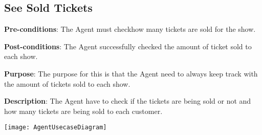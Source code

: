\subsection{See Sold Tickets}
\textbf{Pre-conditions}: The Agent must checkhow many tickets are
sold for the show.

\textbf{Post-conditions}: The Agent successfully checked the amount
of ticket sold to each show.

\textbf{Purpose}: The purpose for this is that the Agent need to
always keep track with the amount of tickets sold to each show.

\textbf{Description}: The Agent have to check if the tickets are
being sold or not and how many tickets are being sold to each
customer.

\texttt{[image: AgentUsecaseDiagram]}
